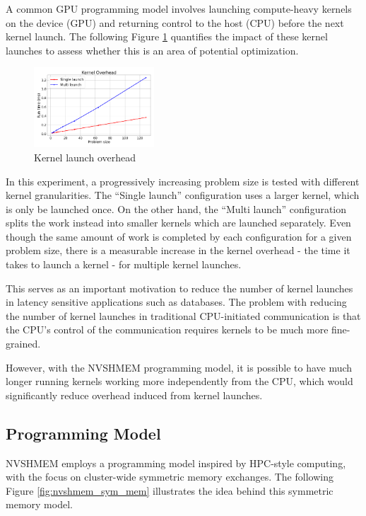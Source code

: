 A common GPU programming model involves launching compute-heavy kernels on the device (GPU) and returning control to the host (CPU) before the next kernel launch.
The following Figure \ref{fig:kernel_launch_overhead} quantifies the impact of these kernel launches to assess whether this is an area of potential optimization.

\begin{figure}[h]
    \centering
    \captionsetup{justification=centering}
    \includegraphics[width=0.4\textwidth]{img/overhead.png}
    \caption{Kernel launch overhead}
    \label{fig:kernel_launch_overhead}
\end{figure}

In this experiment, a progressively increasing problem size is tested with different kernel granularities.
The \enquote{Single launch} configuration uses a larger kernel, which is only be launched once.
On the other hand, the \enquote{Multi launch} configuration splits the work instead into smaller kernels which are launched separately.
Even though the same amount of work is completed by each configuration for a given problem size, there is a measurable increase in the kernel overhead - the time it takes to launch a kernel - for multiple kernel launches.

This serves as an important motivation to reduce the number of kernel launches in latency sensitive applications such as databases.
The problem with reducing the number of kernel launches in traditional CPU-initiated communication is that the CPU's control of the communication requires kernels to be much more fine-grained.

However, with the NVSHMEM programming model, it is possible to have much longer running kernels working more independently from the CPU, which would significantly reduce overhead induced from kernel launches.

\subsection{Programming Model}

NVSHMEM employs a programming model inspired by HPC-style computing, with the focus on cluster-wide symmetric memory exchanges.
The following Figure \ref{fig:nvshmem_sym_mem} illustrates the idea behind this symmetric memory model.

